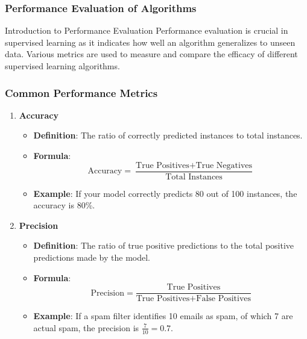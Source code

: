 \documentclass[aspectratio=169]{beamer}
\begin{document}
\begin{frame}[fragile]
    \frametitle{Performance Evaluation of Algorithms}
    \begin{block}{Introduction to Performance Evaluation}
        Performance evaluation is crucial in supervised learning as it indicates how well an algorithm generalizes to unseen data. 
        Various metrics are used to measure and compare the efficacy of different supervised learning algorithms.
    \end{block}
\end{frame}

\begin{frame}[fragile]
    \frametitle{Common Performance Metrics}
    \begin{enumerate}
        \item \textbf{Accuracy}
            \begin{itemize}
                \item \textbf{Definition}: The ratio of correctly predicted instances to total instances.
                \item \textbf{Formula}:
                \begin{equation}
                    \text{Accuracy} = \frac{\text{True Positives} + \text{True Negatives}}{\text{Total Instances}}
                \end{equation}
                \item \textbf{Example}: If your model correctly predicts 80 out of 100 instances, the accuracy is 80\%.
            \end{itemize}
        
        \item \textbf{Precision}
            \begin{itemize}
                \item \textbf{Definition}: The ratio of true positive predictions to the total positive predictions made by the model.
                \item \textbf{Formula}:
                \begin{equation}
                    \text{Precision} = \frac{\text{True Positives}}{\text{True Positives} + \text{False Positives}}
                \end{equation}
                \item \textbf{Example}: If a spam filter identifies 10 emails as spam, of which 7 are actual spam, the precision is \( \frac{7}{10} = 0.7 \).
            \end{itemize}
        

\end{enumerate}
\end{frame}
\end{document}

